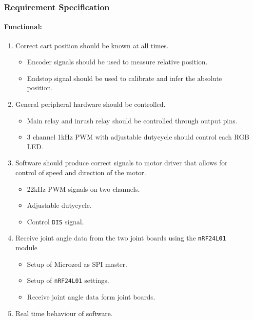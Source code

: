 \subsubsection{Requirement Specification} %
\label{ssub:controller_requirements}

\paragraph{Functional:}
\begin{enumerate}[resume]
	\item Correct cart position should be known at all times.
	\label{enum:correct_cart_position}
	\begin{itemize}
		\item Encoder signals should be used to measure relative position.
		\item Endstop signal should be used to calibrate and infer the absolute position.
	\end{itemize}
	\item General peripheral hardware should be controlled.
	\label{enum:general_peripheral_hardware}
	\begin{itemize}
		\item Main relay and inrush relay should be controlled through output pins.
		\item 3 channel 1kHz PWM with adjustable dutycycle should control each RGB LED.
	\end{itemize}
	\item Software should produce correct signals to motor driver that allows for control of speed and direction of the motor.
	\label{enum:software_correct_motor_driver_signals}
	\begin{itemize}
		\item 22kHz PWM signals on two channels.
		\item Adjustable dutycycle.
		\item Control \texttt{DIS} signal.
 	\end{itemize}
	\item Receive joint angle data from the two joint boards using the \texttt{nRF24L01} module
	\label{enum:receive_joint_angle}
	\begin{itemize}
		\item Setup of Microzed as SPI master.
		\item Setup of \texttt{nRF24L01} settings.
		\item Receive joint angle data form joint boards.
	\end{itemize}
	\item Real time behaviour of software.
	\label{enum:real_time_behavior}
\end{enumerate}

